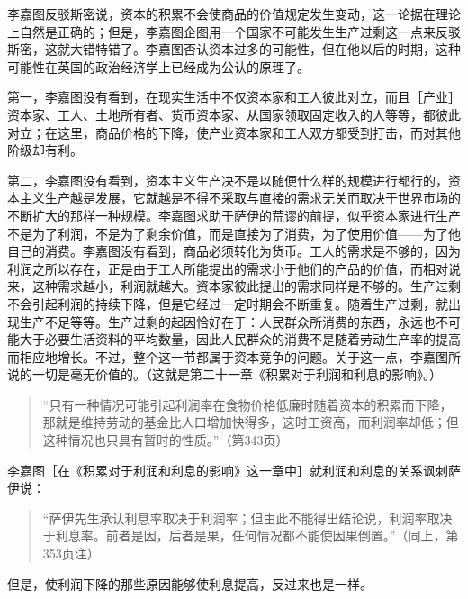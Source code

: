 李嘉图反驳斯密说，资本的积累不会使商品的价值规定发生变动，这一论据在理论上自然是正确的；但是，李嘉图企图用一个国家不可能发生生产过剩这一点来反驳斯密，这就大错特错了。李嘉图否认资本过多的可能性，但在他以后的时期，这种可能性在英国的政治经济学上已经成为公认的原理了。

第一，李嘉图没有看到，在现实生活中不仅资本家和工人彼此对立，而且［产业］资本家、工人、土地所有者、货币资本家、从国家领取固定收入的人等等，都彼此对立；在这里，商品价格的下降，使产业资本家和工人双方都受到打击，而对其他阶级却有利。

第二，李嘉图没有看到，资本主义生产决不是以随便什么样的规模进行都行的，资本主义生产越是发展，它就越是不得不采取与直接的需求无关而取决于世界市场的不断扩大的那样一种规模。李嘉图求助于萨伊的荒谬的前提，似乎资本家进行生产不是为了利润，不是为了剩余价值，而是直接为了消费，为了使用价值——为了他自己的消费。李嘉图没有看到，商品必须转化为货币。工人的需求是不够的，因为利润之所以存在，正是由于工人所能提出的需求小于他们的产品的价值，而相对说来，这种需求越小，利润就越大。资本家彼此提出的需求同样是不够的。生产过剩不会引起利润的持续下降，但是它经过一定时期会不断重复。随着生产过剩，就出现生产不足等等。生产过剩的起因恰好在于：人民群众所消费的东西，永远也不可能大于必要生活资料的平均数量，因此人民群众的消费不是随着劳动生产率的提高而相应地增长。不过，整个这一节都属于资本竞争的问题。关于这一点，李嘉图所说的一切是毫无价值的。（这就是第二十一章《积累对于利润和利息的影响》。）

\begin{quote}{“只有一种情况可能引起利润率在食物价格低廉时随着资本的积累而下降，那就是维持劳动的基金比人口增加快得多，这时工资高，而利润率却低；但这种情况也只具有暂时的性质。”（第343页）}\end{quote}

李嘉图［在《积累对于利润和利息的影响》这一章中］就利润和利息的关系讽刺萨伊说：

\begin{quote}{“萨伊先生承认利息率取决于利润率；但由此不能得出结论说，利润率取决于利息率。前者是因，后者是果，任何情况都不能使因果倒置。”（同上，第353页注）}\end{quote}

但是，使利润下降的那些原因能够使利息提高，反过来也是一样。

